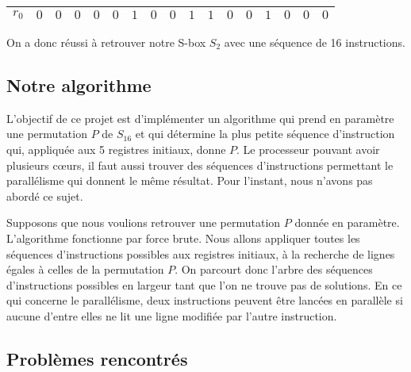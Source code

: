 \documentclass{article}
\begin{document}
\begin{center}
\begin{tabular}{|l|l|l|l|l|l|l|l|l|l|l|l|l|l|l|l|l|}
\hline
\multicolumn{1}{|l|}{ $r_{0}$}&	\multicolumn{1}{|l|}{ $0$}&	\multicolumn{1}{|l|}{ $0$}&	\multicolumn{1}{|l|}{ $0$}&	\multicolumn{1}{|l|}{ $0$}&	\multicolumn{1}{|l|}{ $0$}&	\multicolumn{1}{|l|}{ $1$}&	\multicolumn{1}{|l|}{ $0$}&	\multicolumn{1}{|l|}{ $0$}&	\multicolumn{1}{|l|}{ $1$}&	\multicolumn{1}{|l|}{ $1$}&	\multicolumn{1}{|l|}{ $0$}&	\multicolumn{1}{|l|}{ $0$}&	\multicolumn{1}{|l|}{ $1$}&	\multicolumn{1}{|l|}{ $0$}&	\multicolumn{1}{|l|}{ $0$}&	\multicolumn{1}{|l|}{ $0$}	\\
\hline
\end{tabular}

\end{center}
\medbreak
On a donc réussi à retrouver notre S-box $S_{2}$ avec une séquence de 16 instructions. 

\subsection{Notre algorithme}

L'objectif de ce projet est d'implémenter un algorithme qui prend en paramètre une permutation $P$ de $S_{16}$ et qui détermine la plus petite séquence d'instruction qui, appliquée aux 5 registres initiaux, donne $P$. Le processeur pouvant avoir plusieurs cœurs, il faut aussi trouver des séquences d'instructions permettant le parallélisme qui donnent le même résultat. Pour l'instant, nous n'avons pas abordé ce sujet.
       
Supposons que nous voulions retrouver une permutation $P$ donnée en paramètre. L'algorithme fonctionne par force brute. Nous allons appliquer toutes les séquences d'instructions possibles aux registres initiaux, à la recherche de lignes égales à celles de la permutation $P$. On parcourt donc l'arbre des séquences d'instructions possibles en largeur tant que l'on ne trouve pas de solutions. En ce qui concerne le parallélisme, deux instructions peuvent être lancées en parallèle si aucune d'entre elles ne lit une ligne modifiée par l'autre instruction.

\subsection{Problèmes rencontrés}
\end{document}
